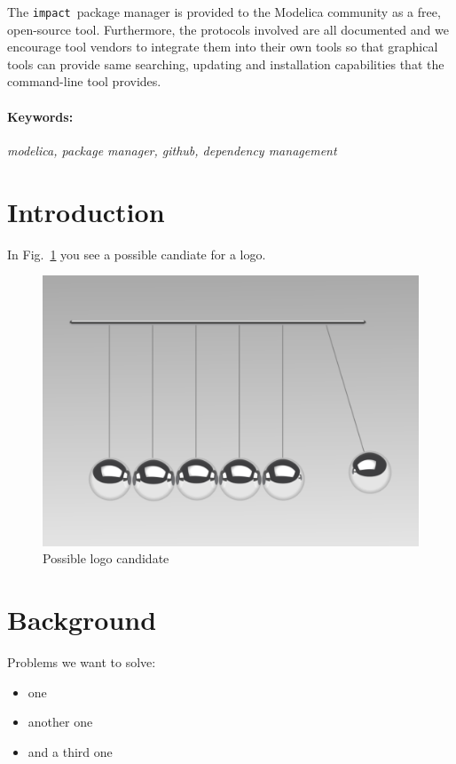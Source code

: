 \documentclass[11pt,a4paper,twocolumn]{article}
\newcommand{\impact}{\texttt{impact}} %
\begin{document}
The \impact\ package manager is provided to the Modelica community
as a free, open-source tool.  Furthermore, the protocols involved are
all documented and we encourage tool vendors to integrate them into
their own tools so that graphical tools can provide same searching,
updating and installation capabilities that the command-line tool
provides.

\paragraph{Keywords:}\emph{modelica, package manager, github, dependency management}

\section{Introduction}
\label{sec:intro}
In Fig.~\ref{fig:newtons_cradle} you see a possible candiate for a logo.


\begin{figure}[!ht]
  \centering
  \includegraphics[width=\columnwidth]{newtons_cradle}
  \caption{Possible logo candidate \cite{Andersson2007}}
  \label{fig:newtons_cradle}
\end{figure}


\section{Background}
\label{sec:background}

Problems we want to solve:
\begin{itemize}
\item one
\item another one
\item and a third one
\end{itemize}
\end{document}
